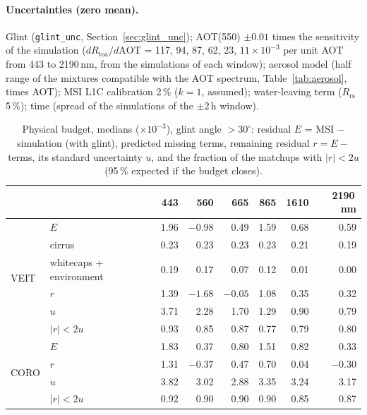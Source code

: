 \documentclass[11pt,a4paper]{article}
\newcommand{\Rrs}{R_\mathrm{rs}}
\newcommand{\code}[1]{\texttt{#1}}
\begin{document}
\paragraph{Uncertainties (zero mean).} Glint (\code{glint\_unc}, Section~\ref{sec:glint_unc}); AOT(550) $\pm0.01$
times the sensitivity of the simulation ($dR_\mathrm{toa}/d\mathrm{AOT}$ = 117, 94, 87, 62, 23, $11\times10^{-3}$ per
unit AOT from 443 to 2190\,nm, from the simulations of each window); aerosol model (half range of the mixtures
compatible with the AOT spectrum, Table~\ref{tab:aerosol}, times AOT); MSI L1C calibration 2\,\% ($k = 1$, assumed);
water-leaving term ($\Rrs$ 5\,\%); time (spread of the simulations of the $\pm2$\,h window).

\begin{table}[h]
\centering\small
\caption{Physical budget, medians ($\times10^{-3}$), glint angle $>30^\circ$: residual $E$ = MSI $-$ simulation
(with glint), predicted missing terms, remaining residual $r = E -$ terms, its standard uncertainty $u$, and the
fraction of the matchups with $|r| < 2u$ (95\,\% expected if the budget closes).}
\label{tab:phys_budget}
\begin{tabular}{llrrrrrr}
\toprule
 & & 443 & 560 & 665 & 865 & 1610 & 2190\,nm \\
\midrule
\multirow{6}{*}{VEIT} & $E$ & 1.96 & $-0.98$ & 0.49 & 1.59 & 0.68 & 0.59 \\
 & cirrus & 0.23 & 0.23 & 0.23 & 0.23 & 0.21 & 0.19 \\
 & whitecaps + environment & 0.19 & 0.17 & 0.07 & 0.12 & 0.01 & 0.00 \\
 & $r$ & 1.39 & $-1.68$ & $-0.05$ & 1.08 & 0.35 & 0.32 \\
 & $u$ & 3.71 & 2.28 & 1.70 & 1.29 & 0.90 & 0.79 \\
 & $|r|<2u$ & 0.93 & 0.85 & 0.87 & 0.77 & 0.79 & 0.80 \\
\midrule
\multirow{4}{*}{CORO} & $E$ & 1.83 & 0.37 & 0.80 & 1.51 & 0.82 & 0.33 \\
 & $r$ & 1.31 & $-0.37$ & 0.47 & 0.70 & 0.04 & $-0.30$ \\
 & $u$ & 3.82 & 3.02 & 2.88 & 3.35 & 3.24 & 3.17 \\
 & $|r|<2u$ & 0.92 & 0.90 & 0.90 & 0.90 & 0.85 & 0.87 \\
\bottomrule
\end{tabular}
\end{table}
\end{document}
